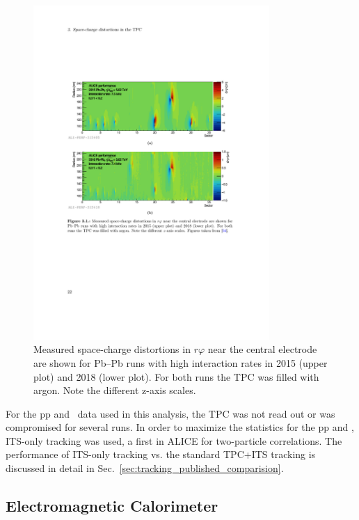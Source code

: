 \begin{figure}[htpb]
  \centering
  \includegraphics[width=0.8\textwidth]{Experimental_Aparatus/TPC_distortion.pdf}
  \caption{Measured space-charge distortions in $r\varphi$ near the central electrode are shown for Pb–Pb runs with high interaction rates in 2015 (upper plot) and 2018 (lower plot). For both runs the TPC was filled with argon. Note the different z-axis scales. \cite{Hellbar2019}}
  \label{fig:tpc_distortion}
\end{figure}


For the pp and \pPb~data used in this analysis, the TPC was not read out or was compromised for several runs. In order to maximize the statistics for the pp and \pPb, ITS-only tracking was used, a first in ALICE for two-particle correlations. The performance of ITS-only tracking vs. the standard TPC+ITS tracking is discussed in detail in Sec.~\ref{sec:tracking_published_comparision}.

\FloatBarrier
\subsection{Electromagnetic Calorimeter}
\label{sec:EMCal}

